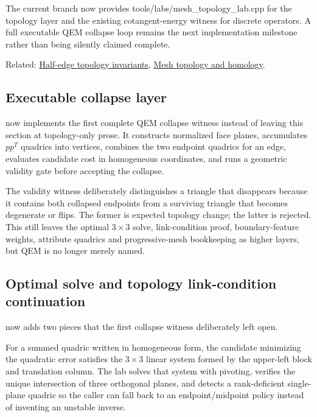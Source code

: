 The current branch now provides tools/labs/mesh\_topology\_lab.cpp for the topology layer and the existing cotangent-energy witness for discrete operators. A full executable QEM collapse loop remains the next implementation milestone rather than being silently claimed complete.

Related: \hyperref[appendix-faac749c9cdd]{Half-edge topology invariants}, \hyperref[appendix-e38976cbbf86]{Mesh topology and homology}.

\subsection{Executable collapse layer}\label{appendix-89db9fe1bc8a-executable-collapse-layer}

\hypertarget{appendix-89db9fe1bc8a-executable-collapse-layer}{}

 now implements the first complete QEM collapse witness instead of leaving this section at topology-only prose. It constructs normalized face planes, accumulates \(pp^T\) quadrics into vertices, combines the two endpoint quadrics for an edge, evaluates candidate cost in homogeneous coordinates, and runs a geometric validity gate before accepting the collapse.

The validity witness deliberately distinguishes a triangle that disappears because it contains both collapsed endpoints from a surviving triangle that becomes degenerate or flips. The former is expected topology change; the latter is rejected. This still leaves the optimal \(3\times3\) solve, link-condition proof, boundary-feature weights, attribute quadrics and progressive-mesh bookkeeping as higher layers, but QEM is no longer merely named.

\subsection{Optimal solve and topology link-condition continuation}\label{appendix-89db9fe1bc8a-optimal-solve-and-topology-link-condition-continuation}

\hypertarget{appendix-89db9fe1bc8a-optimal-solve-and-topology-link-condition-continuation}{}

 now adds two pieces that the first collapse witness deliberately left open.

For a summed quadric written in homogeneous form, the candidate minimizing the quadratic error satisfies the \(3\times3\) linear system formed by the upper-left block and translation column. The lab solves that system with pivoting, verifies the unique intersection of three orthogonal planes, and detects a rank-deficient single-plane quadric so the caller can fall back to an endpoint/midpoint policy instead of inventing an unstable inverse.

